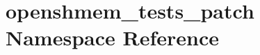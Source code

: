 \hypertarget{namespaceopenshmem__tests__patch}{\section{openshmem\-\_\-tests\-\_\-patch Namespace Reference}
\label{namespaceopenshmem__tests__patch}
}
